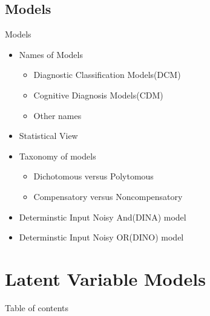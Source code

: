 \documentclass[handout]{beamer}
\begin{document}
\subsection{Models}
\begin{frame}{Models}
\begin{itemize}
	\item
		Names of Models
		\begin{itemize}
			\item
			Diagnostic Classification Models(DCM)
			\item
			Cognitive Diagnosis Models(CDM)
			\item
			Other names
		\end{itemize}	
	\item
		Statistical View

	\item
		Taxonomy of models
		\begin{itemize}
			\item
			Dichotomous versus Polytomous
			\item
			Compensatory versus Noncompensatory			
		\end{itemize}
	\item
		Determinstic Input Noisy And(DINA) model
	\item
		Determinstic Input Noisy OR(DINO) model
\end{itemize}
\end{frame}

\section[LVM]{Latent Variable Models}
\begin{frame}{Table of contents}
\begin{multicols}{2}
\end{multicols}
\end{frame}
\end{document}
